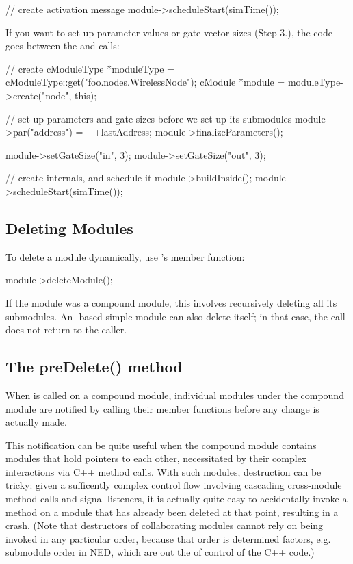 \begin{ned}
\begin{cpp}
// create activation message
module->scheduleStart(simTime());
\end{cpp}

If you want to set up parameter values or gate vector sizes (Step 3.),
the code goes between the  and
 calls:

\begin{cpp}
// create
cModuleType *moduleType = cModuleType::get("foo.nodes.WirelessNode");
cModule *module = moduleType->create("node", this);

// set up parameters and gate sizes before we set up its submodules
module->par("address") = ++lastAddress;
module->finalizeParameters();

module->setGateSize("in", 3);
module->setGateSize("out", 3);

// create internals, and schedule it
module->buildInside();
module->scheduleStart(simTime());
\end{cpp}


\subsection{Deleting Modules}
\label{sec:simple-modules:deleting-modules}

To delete a module dynamically, use
's  member function:

\begin{cpp}
module->deleteModule();
\end{cpp}

If the module was a compound module, this involves recursively
deleting all its submodules. An -based simple module
can also delete itself; in that case, the  call
does not return to the caller.


\subsection{The preDelete() method}
\label{sec:simple-modules:predelete}

When  is called on a compound module, individual modules
under the compound module are notified by calling their 
member functions before any change is actually made.

This notification can be quite useful when the compound module contains modules
that hold pointers to each other, necessitated by their complex interactions via
C++ method calls. With such modules, destruction can be tricky: given a
sufficently complex control flow involving cascading cross-module method calls
and signal listeners, it is actually quite easy to accidentally invoke a method
on a module that has already been deleted at that point, resulting in a crash.
(Note that destructors of collaborating modules cannot rely on being invoked in
any particular order, because that order is determined factors, e.g. submodule
order in NED, which are out the of control of the C++ code.)


\end{ned}
